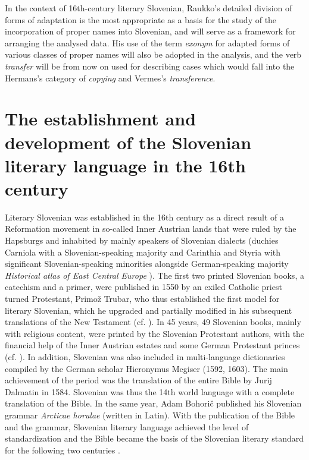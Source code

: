 \documentclass[output=paper,colorlinks,citecolor=brown,arabicfont,chinesefont]{langscibook}
\begin{document}
In the context of 16th-century literary Slovenian, Raukko’s detailed division of forms of adaptation is the most appropriate as a basis for the study of the incorporation of proper names into Slovenian, and will serve as a framework for arranging the analysed data. His use of the term \emph{exonym} for adapted forms of various classes of proper names will also be adopted in the analysis, and the verb \emph{transfer} will be from now on used for describing cases which would fall into the Hermans’s category of \emph{copying} and Vermes’s \emph{transference}.

\section{The establishment and development of the Slovenian literary language in the 16th century}

Literary Slovenian was established in the 16th century as a direct result of a Reformation movement in so-called Inner Austrian lands that were ruled by the Hapsburgs and inhabited by mainly speakers of Slovenian dialects (duchies Carniola with a Slovenian-speaking majority and Carinthia and Styria with significant Slovenian-speaking minorities alongside German-speaking majority \emph {Historical atlas of East Central Europe} \citep[99]{MagocsiMatthews1993}). The first two printed Slovenian books, a catechism and a primer, were published in 1550 by an exiled Catholic priest turned Protestant, Primož Trubar, who thus established the first model for literary Slovenian, which he upgraded and partially modified in his subsequent translations of the New Testament (cf. \citealt{Cooper1985}). In 45 years, 49 Slovenian books, mainly with religious content, were printed by the Slovenian Protestant authors, with the financial help of the Inner Austrian estates and some German Protestant princes (cf. \citealt[64--73]{Ahacic2014}). In addition, Slovenian was also included in multi-language dictionaries compiled by the German scholar Hieronymus Megiser (1592, 1603). The main achievement of the period was the translation of the entire Bible by Jurij Dalmatin in 1584. Slovenian was thus the 14th world language with a complete translation of the Bible. In the same year, Adam Bohorič published his Slovenian grammar \emph{Arcticae horulae} (written in Latin). With the publication of the Bible and the grammar, Slovenian literary language achieved the level of standardization and the Bible became the basis of the Slovenian literary standard for the following two centuries \citep[35]{Pogorelec2011}.
\end{document}
